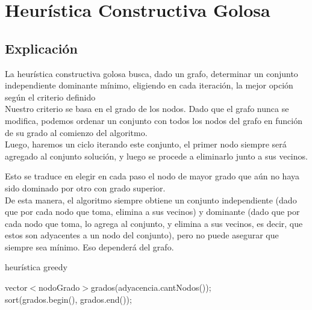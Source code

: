 \section{Heur\'istica Constructiva Golosa} \label{ej3}
\subsection{Explicaci\'on}
La heurística constructiva golosa busca, dado un grafo, determinar un conjunto independiente dominante mínimo, eligiendo en cada iteraci\'on, la mejor opci\'on seg\'un el criterio definido\\

Nuestro criterio se basa en el grado de los nodos. Dado que el grafo nunca se modifica, podemos ordenar un conjunto con todos los nodos del grafo en funci\'on de su grado al comienzo del algoritmo.\\

Luego, haremos un ciclo iterando este conjunto, el primer nodo siempre ser\'a agregado al conjunto soluci\'on, y luego se procede a eliminarlo junto a sus vecinos.

Esto se traduce en elegir en cada paso el nodo de mayor grado que a\'un no haya sido dominado por otro con grado superior.\\

De esta manera, el algoritmo siempre obtiene un conjunto independiente (dado que por cada nodo que toma, elimina a sus vecinos) y dominante (dado que por cada nodo que toma, lo agrega al conjunto, y elimina a sus vecinos, es decir, que estos son adyacentes a un nodo del conjunto), pero no puede asegurar que siempre sea mínimo. Eso dependerá del grafo.\\

\begin{algorithm}[h!]
\caption{heur\'istica greedy}
vector$<$nodoGrado$>$grados(adyacencia.cantNodos());\\
sort(grados.begin(), grados.end());\\
\end{algorithm}

